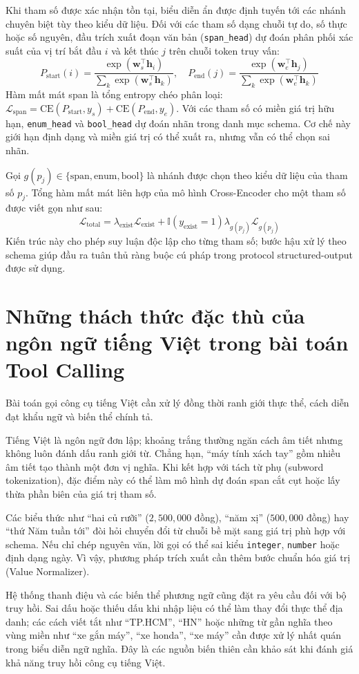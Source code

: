 Khi tham số được xác nhận tồn tại, biểu diễn ẩn được định tuyến tới các nhánh chuyên biệt tùy theo kiểu dữ liệu. Đối với các tham số dạng chuỗi tự do, số thực hoặc số nguyên, đầu trích xuất đoạn văn bản (\texttt{span_head}) dự đoán phân phối xác suất của vị trí bắt đầu $i$ và kết thúc $j$ trên chuỗi token truy vấn:
$$P_{\text{start}}(i) = \frac{\exp(\mathbf{w}_s^\top \mathbf{h}_i)}{\sum_k \exp(\mathbf{w}_s^\top \mathbf{h}_k)}, \quad P_{\text{end}}(j) = \frac{\exp(\mathbf{w}_e^\top \mathbf{h}_j)}{\sum_k \exp(\mathbf{w}_e^\top \mathbf{h}_k)}$$
Hàm mất mát span là tổng entropy chéo phân loại: $\mathcal{L}_{\text{span}} = \text{CE}(P_{\text{start}}, y_s) + \text{CE}(P_{\text{end}}, y_e)$. Với các tham số có miền giá trị hữu hạn, \texttt{enum_head} và \texttt{bool_head} dự đoán nhãn trong danh mục schema. Cơ chế này giới hạn định dạng và miền giá trị có thể xuất ra, nhưng vẫn có thể chọn sai nhãn.

Gọi $g(p_j)\in\{\text{span},\text{enum},\text{bool}\}$ là nhánh được chọn theo kiểu dữ liệu của tham số $p_j$. Tổng hàm mất mát liên hợp của mô hình Cross-Encoder cho một tham số được viết gọn như sau:
$$\mathcal{L}_{\text{total}} = \lambda_{\text{exist}}\mathcal{L}_{\text{exist}} + \mathbb{I}(y_{\text{exist}}=1)\lambda_{g(p_j)}\mathcal{L}_{g(p_j)}$$
Kiến trúc này cho phép suy luận độc lập cho từng tham số; bước hậu xử lý theo schema giúp đầu ra tuân thủ ràng buộc cú pháp trong protocol structured-output được sử dụng.

\section{Những thách thức đặc thù của ngôn ngữ tiếng Việt trong bài toán Tool Calling}

Bài toán gọi công cụ tiếng Việt cần xử lý đồng thời ranh giới thực thể, cách diễn đạt khẩu ngữ và biến thể chính tả.

Tiếng Việt là ngôn ngữ đơn lập; khoảng trắng thường ngăn cách âm tiết nhưng không luôn đánh dấu ranh giới từ. Chẳng hạn, “máy tính xách tay” gồm nhiều âm tiết tạo thành một đơn vị nghĩa. Khi kết hợp với tách từ phụ (subword tokenization), đặc điểm này có thể làm mô hình dự đoán span cắt cụt hoặc lấy thừa phần biên của giá trị tham số.

Các biểu thức như “hai củ rưỡi” ($2{,}500{,}000$ đồng), “năm xị” ($500{,}000$ đồng) hay “thứ Năm tuần tới” đòi hỏi chuyển đổi từ chuỗi bề mặt sang giá trị phù hợp với schema. Nếu chỉ chép nguyên văn, lời gọi có thể sai kiểu \texttt{integer}, \texttt{number} hoặc định dạng ngày. Vì vậy, phương pháp trích xuất cần thêm bước chuẩn hóa giá trị (Value Normalizer).

Hệ thống thanh điệu và các biến thể phương ngữ cũng đặt ra yêu cầu đối với bộ truy hồi. Sai dấu hoặc thiếu dấu khi nhập liệu có thể làm thay đổi thực thể địa danh; các cách viết tắt như “TP.HCM”, “HN” hoặc những từ gần nghĩa theo vùng miền như “xe gắn máy”, “xe honda”, “xe máy” cần được xử lý nhất quán trong biểu diễn ngữ nghĩa. Đây là các nguồn biến thiên cần khảo sát khi đánh giá khả năng truy hồi công cụ tiếng Việt.

